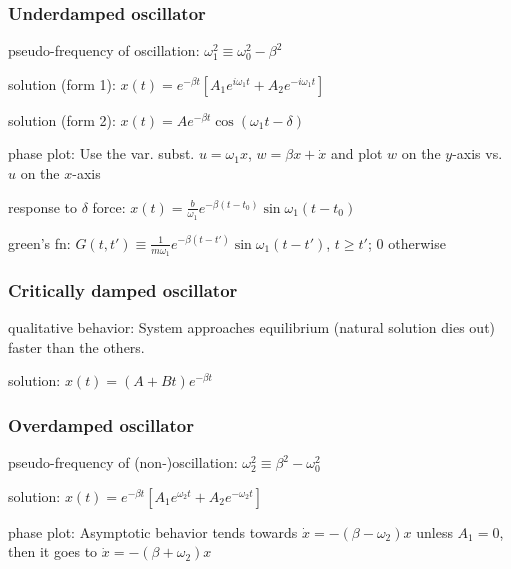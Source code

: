 \documentclass[letterpaper,landscape,10pt]{article}
\newenvironment{mydescription}
{\begin{description}
	\setlength{\itemsep}{0pt}
	\setlength{\parskip}{0pt}
	\setlength{\parsep}{-1pt}}
{\end{description}}
\begin{document}
{\begin{multicols}{3}
	\subsubsection*{Underdamped oscillator}
		\begin{mydescription}
			\item[pseudo-frequency of oscillation:]
				$\omega_1^2 \equiv \omega_0^2 - \beta^2$  \\
			\item[solution (form 1):]
				$x(t) = e^{-\beta t}\left[ A_1e^{i\omega_1t} +
				A_2e^{-i\omega_1t} \right]$  \\
			\item[solution (form 2):]
				$x(t) = Ae^{-\beta t}\cos(\omega_1t-\delta)$  \\
			\item[phase plot:]
				Use the var. subst. $u=\omega_1 x$, $w=\beta x+\dot{x}$ and
				plot $w$ on the $y$-axis vs. $u$ on the $x$-axis \\
			\item[response to $\delta$ force:]
				$x(t) = \frac{b}{\omega_1}e^{-\beta
				(t-t_0)}\sin\omega_1(t-t_0)$  \\
			\item[green's fn:]
				$G(t,t') \equiv \frac{1}{m\omega_1}e^{-\beta
				(t-t')}\sin\omega_1(t-t')$, $t\geq t'$; $0$ otherwise  \\
		\end{mydescription}
	
	\subsubsection*{Critically damped oscillator}
		\begin{mydescription}
			\item[qualitative behavior:]
				System approaches equilibrium (natural solution dies out)
				faster than the others.\\
			\item[solution:]
				$x(t) = (A+Bt)e^{-\beta t}$  \\
		\end{mydescription}
	
	\subsubsection*{Overdamped oscillator}
		\begin{mydescription}
			\item[pseudo-frequency of (non-)oscillation:]
				$\omega_2^2 \equiv \beta^2 - \omega_0^2$  \\
			\item[solution:]
				$x(t) = e^{-\beta t}\left[ A_1e^{\omega_2t} + A_2e^{-\omega_2t}
				\right]$  \\
			\item[phase plot:]
				Asymptotic behavior tends towards $\dot{x}=-(\beta-\omega_2)x$
				unless $A_1=0$, then it goes to $\dot{x}=-(\beta+\omega_2)x$
		\end{mydescription}
	

\end{multicols}}
\end{document}
